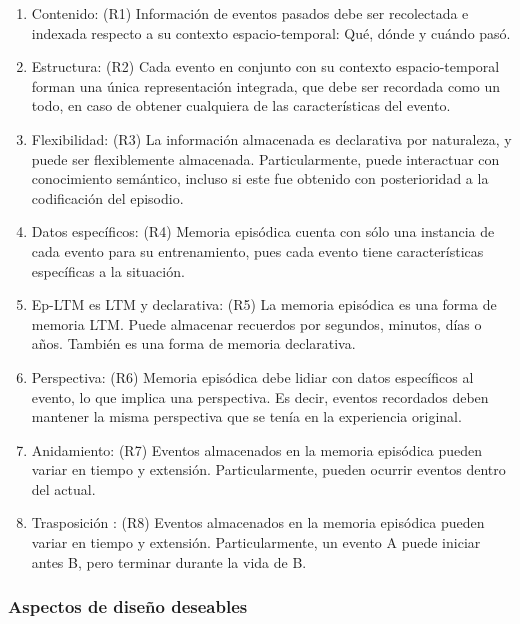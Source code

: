 \begin{enumerate}[topsep=0pt]
\setlength\itemsep{0.2em}
\item Contenido: (R1) Informaci\'on de eventos pasados debe ser recolectada e indexada respecto a su contexto espacio-temporal: Qu\'e, d\'onde y cu\'ando pas\'o.

\item Estructura: (R2) Cada evento en conjunto con su contexto espacio-temporal forman una \'unica representaci\'on integrada, que debe ser recordada como un todo, en caso de obtener cualquiera de las caracter\'isticas del evento.

\item Flexibilidad: (R3) La informaci\'on almacenada es declarativa por naturaleza, y puede ser flexiblemente almacenada. Particularmente, puede interactuar con conocimiento sem\'antico, incluso si este fue obtenido con posterioridad a la codificaci\'on del episodio.

\item Datos espec\'ificos: (R4) Memoria epis\'odica cuenta con s\'olo una instancia de cada evento para su entrenamiento, pues cada evento tiene caracter\'isticas espec\'ificas a la situaci\'on.

\item Ep-LTM es LTM y declarativa: (R5) La memoria epis\'odica es una forma de memoria LTM. Puede almacenar recuerdos por segundos, minutos, d\'ias o a\~nos. Tambi\'en es una forma de memoria declarativa.

\item Perspectiva: (R6) Memoria epis\'odica debe lidiar con datos espec\'ificos al evento, lo que implica una perspectiva. Es decir, eventos recordados deben mantener la misma perspectiva que se ten\'ia en la experiencia original.

\item Anidamiento: (R7) Eventos almacenados en la memoria epis\'odica pueden variar en tiempo y extensi\'on. Particularmente, pueden ocurrir eventos dentro del actual.

\item Trasposici\'on : (R8)  Eventos almacenados en la memoria epis\'odica pueden variar en tiempo y extensi\'on. Particularmente, un evento A puede iniciar antes B, pero terminar durante la vida de B.

\end{enumerate}

\subsubsection{Aspectos de dise\~no deseables}

